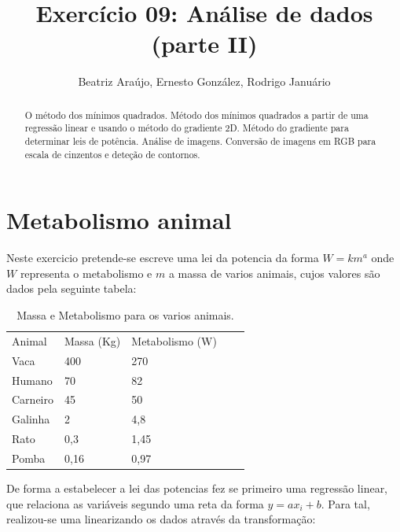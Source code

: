 \documentclass[aps,pre,twocolumn,showpacs,amsmath,amssymb]{revtex4-1}
\begin{document}
\title{Exercício 09: Análise de dados (parte II)}

\author{Beatriz Araújo, Ernesto González, Rodrigo Januário}

\begin{abstract}
  O método dos mínimos quadrados. Método dos mínimos quadrados a partir de uma regressão linear e usando o método do gradiente 2D. Método do gradiente para determinar leis de potência. Análise de imagens. Conversão de imagens em RGB para escala de cinzentos e deteção de contornos.
\end{abstract}

\maketitle

\section{Metabolismo animal}

    Neste exercicio pretende-se escreve uma lei da potencia da forma $W=km^a$ onde $W$ representa o metabolismo e $m$ a massa de varios animais, cujos valores são dados pela seguinte tabela:

    \begin{table}[h!]
        \caption{Massa e Metabolismo para os varios animais.}
        \begin{tabular}{|l|l|l|ll}
            \cline{1-3}
            Animal & Massa (Kg) & Metabolismo (W) &  &  \\ \cline{1-3}
            Vaca & 400 & 270 &  &  \\ \cline{1-3}
            Humano & 70 & 82 &  &  \\ \cline{1-3}
            Carneiro & 45 & 50 &  &  \\ \cline{1-3}
            Galinha & 2 & 4,8 &  &  \\ \cline{1-3}
            Rato & 0,3 & 1,45 &  &  \\ \cline{1-3}
            Pomba & 0,16 & 0,97 &  &  \\ \cline{1-3}
        \end{tabular}
    \end{table}

    De forma a estabelecer a lei das potencias fez se primeiro uma regressão linear, que relaciona as variáveis segundo uma reta da forma $y = ax_i + b$. Para tal, realizou-se uma linearizando os dados através da transformação:
\end{document}
